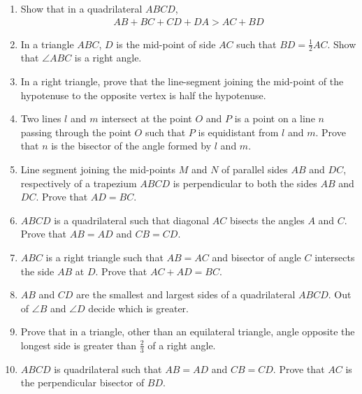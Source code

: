 \documentclass {article}
\begin{document}
\begin {enumerate}
\item Show that in a quadrilateral $ABCD$,
\begin{align*}
	AB + BC + CD + DA  >   AC + BD
\end{align*}
\item In a triangle $ABC$, $D$ is the mid-point of side $AC$ such that $ BD = \frac{1}{2} AC $. Show that $\angle ABC$ is a right angle.
\item In a right triangle, prove that the line-segment joining the mid-point of the hypotenuse to the opposite vertex is half the hypotenuse.
\item Two lines $l$ and $m$ intersect at the point $O$ and $P$ is a point on a line $n$ passing through the point $O$ such that $P$ is equidistant from $l$ and $m$. Prove that $n$ is the bisector of the angle formed by $l$ and $m$.
\item Line segment joining the mid-points $M$ and $N$ of parallel sides $AB$ and $DC$, respectively of a trapezium $ABCD$ is perpendicular to both the sides $AB$ and $DC$. Prove that $AD = BC$.
\item $ABCD$ is a quadrilateral such that diagonal $AC$ bisects the angles $A$ and $C$. Prove that $AB = AD$ and $CB = CD$.
\item $ABC$ is a right triangle such that $AB = AC$ and bisector of angle $C$ intersects the side $AB$ at $D$. Prove that $AC + AD = BC$.
\item $AB$ and $CD$ are the smallest and largest sides of a quadrilateral $ABCD$. Out of $\angle B$ and $\angle D$ decide which is greater.
\item Prove that in a triangle, other than an equilateral triangle, angle opposite the longest side is greater than $\frac{2}{3}$ of a right angle.
\item $ABCD$ is quadrilateral such that $AB = AD$ and $CB = CD$. Prove that $AC$ is the perpendicular bisector of $BD$.



\end{enumerate}
\end{document}
